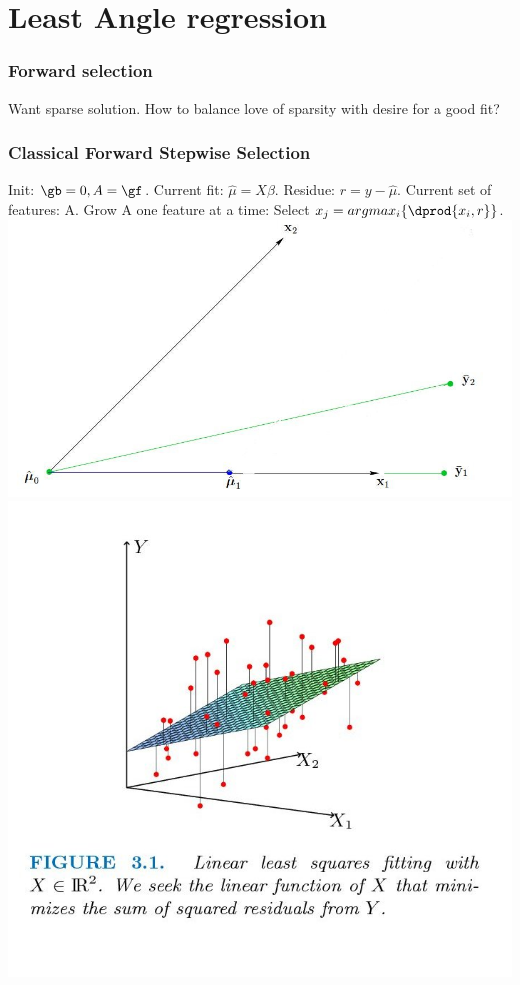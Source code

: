 \documentclass{beamer}
\begin{document}
\section{Least Angle regression}
\begin{frame}
\frametitle{Forward selection}
\begin{itemize}
\pitem Want sparse solution.
\pitem How to balance love of sparsity with desire for a good fit?
\end{itemize}
\end{frame}

\begin{frame}
\frametitle{Classical Forward Stepwise Selection}
\begin{itemize}
\pitem Init: $\gb = 0, A = \gf$.
\pitem Current fit: $\hat{\mu} = X \beta$. Residue: $r = y - \hat{\mu}$. Current set of features: A.
\pitem Grow A one feature at a time: Select $x_j = argmax_i\{\dprod{x_i, r}\}$. \\
\includegraphics[scale=.2]{images/ForwardSelectionExample.jpg}
\includegraphics[scale=0.1]{images/figures3-0.jpg}
\end{itemize}
\end{frame}
\end{document}
